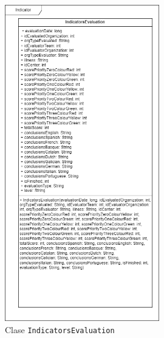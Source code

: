 \begin{itemize}
\begin{figure}[H]
    \centering
    \includegraphics[width=0.6\textwidth]{./Figuras/Diagramas/IndicatorsEvaluation.png}
    \caption{Clase \texttt{IndicatorsEvaluation}}\label{fig:./Figuras/Diagramas/IndicatorsEvaluation.png}
\end{figure}
        

\end{itemize}
